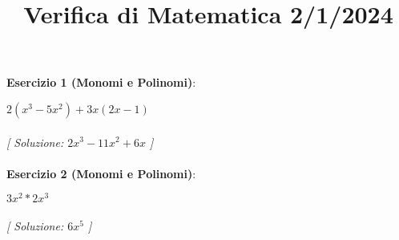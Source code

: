 \documentclass{article}
\title{\raggedright Verifica di Matematica  2/1/2024}
\date{}
\begin{document}
\maketitle

\textbf{Esercizio 1 (Monomi e Polinomi)}:\\
\par $2(x^3 - 5x^2) + 3x(2x - 1)$ \\\\

\textit{[ Soluzione: $2x^3 - 11x^2 + 6x$ ]}\\\\

\textbf{Esercizio 2 (Monomi e Polinomi)}:\\
\par $3x^2 * 2x^3$ \\\\

\textit{[ Soluzione: $6x^5$ ]}\\\\
\end{document}
